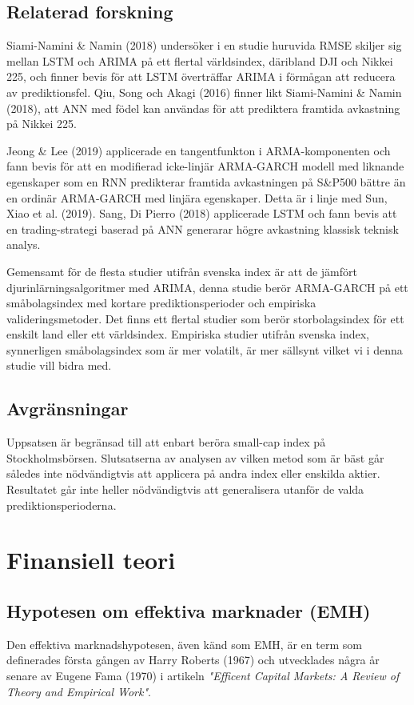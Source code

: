 \documentclass[12pt]{article}
\begin{document}
\subsection{Relaterad forskning}

Siami-Namini \& Namin (2018) undersöker i en studie huruvida RMSE skiljer sig mellan LSTM och ARIMA på ett flertal världsindex, däribland DJI och Nikkei 225, och finner bevis för att LSTM överträffar ARIMA i förmågan att reducera av prediktionsfel. Qiu, Song och Akagi (2016) finner likt Siami-Namini \& Namin (2018), att ANN med födel kan användas för att prediktera framtida avkastning på Nikkei 225. 

Jeong \& Lee (2019) applicerade en tangentfunkton i ARMA-komponenten och fann bevis för att en modifierad icke-linjär ARMA-GARCH modell med liknande egenskaper som en RNN predikterar framtida avkastningen på S\&P500 bättre än en ordinär ARMA-GARCH med linjära egenskaper. Detta är i linje med Sun, Xiao et al. (2019). Sang, Di Pierro (2018) applicerade LSTM och fann bevis att en trading-strategi baserad på ANN generarar högre avkastning klassisk teknisk analys. 

Gemensamt för de flesta studier utifrån svenska index är att de jämfört djurinlärningsalgoritmer med ARIMA, denna studie berör ARMA-GARCH på ett småbolagsindex med kortare prediktionsperioder och empiriska valideringsmetoder. Det finns ett flertal studier som berör storbolagsindex för ett enskilt land eller ett världsindex. Empiriska studier utifrån svenska index, synnerligen småbolagsindex som är mer volatilt, är mer sällsynt vilket vi i denna studie vill bidra med. 

 
\subsection{Avgränsningar}
Uppsatsen är begränsad till att enbart beröra small-cap index på Stockholmsbörsen. Slutsatserna av analysen av vilken metod som är bäst går således inte nödvändigtvis att applicera på andra index eller enskilda aktier. Resultatet går inte heller nödvändigtvis att generalisera utanför de valda prediktionsperioderna.

\section{Finansiell teori}
\subsection{Hypotesen om effektiva marknader (EMH)}
Den effektiva marknadshypotesen, även känd som EMH, är en term som definerades första gången av Harry Roberts (1967) och utvecklades några år senare av Eugene Fama (1970) \parencite{EMHhistory} i artikeln \emph{"Efficent Capital Markets: A Review of Theory and Empirical Work"}. 
\end{document}
